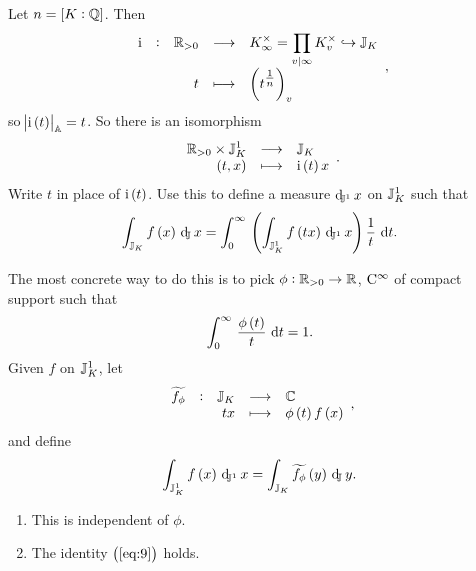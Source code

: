Let $ n = \sbr{K : \QQ} $. Then
$$ \function[\i]{\RR_{> 0}}{K_\infty^\times = \prod_{v \mid \infty} K_v^\times \hookrightarrow \JJ_K}{t}{\br{t^{\tfrac{1}{n}}}_v}, $$
so $ \abs{\i\br{t}}_\AA = t $. So there is an isomorphism
$$ \function{\RR_{> 0} \times \JJ_K^1}{\JJ_K}{\br{t, x}}{\i\br{t}x}. $$
Write $ t $ in place of $ \i\br{t} $. Use this to define a measure $ \dJI x $ on $ \mathbb{J}_K^1 $ such that
\begin{equation}
\label{eq:9}
\intJ{f\br{x}}{x} = \intd{0}{\infty}{\br{\intJI{f\br{tx}}{x}}\dfrac{1}{t}}{t}.
\end{equation}

\pagebreak

The most concrete way to do this is to pick $ \phi : \mathbb{R}_{> 0} \to \mathbb{R} $, $ \mathrm{C}^\infty $ of compact support such that
$$ \intd{0}{\infty}{\dfrac{\phi\br{t}}{t}}{t} = 1. $$
Given $ f $ on $ \mathbb{J}_K^1 $, let
$$ \function[\widetilde{f_\phi}]{\JJ_K}{\CC}{tx}{\phi\br{t}f\br{x}}, $$
and define
$$ \intJI{f\br{x}}{x} = \intJ{\widetilde{f_\phi}\br{y}}{y}. $$

\begin{lemma}
\label{lem:9.12}
\hfill
\begin{enumerate}
\item This is independent of $ \phi $.
\item The identity $ \br{\ref{eq:9}} $ holds.
\end{enumerate}
\end{lemma}

